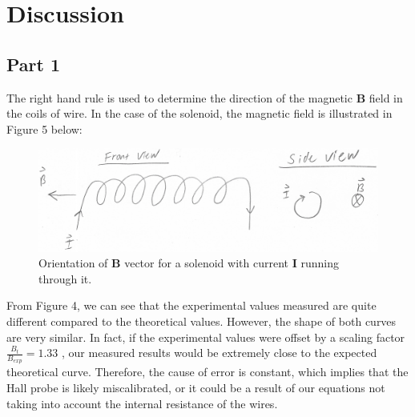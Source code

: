 \documentclass[letterpaper]{article}
\begin{document}

\section{Discussion}

\subsection{Part 1}

The right hand rule is used to determine the
direction of the magnetic $\textbf{B}$ field in the coils of wire. In the case of the
solenoid, the magnetic field is illustrated in Figure 5 below:

\begin{figure}[H]
    \centering
    \includegraphics[width=\textwidth]{question1.jpg}
    \caption{Orientation of \textbf{B} vector for a solenoid with current \textbf{I} running through it.}
\end{figure}

From Figure 4, we can see that the experimental values measured are quite different
compared to the theoretical values. However, the shape of both curves are very similar.
In fact, if the experimental values were offset by a scaling factor $\frac{B_t}{B_{exp}}=1.33$ , our
measured results would be extremely close to the expected theoretical curve. Therefore,
the cause of error is constant, which implies that the Hall probe is likely miscalibrated,
or it could be a result of our equations not taking into account the internal resistance of the wires.
\end{document}
